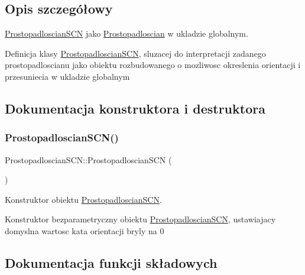 \subsection{Opis szczegółowy}
\hyperlink{classProstopadloscianSCN}{Prostopadloscian\+S\+CN} jako \hyperlink{classProstopadloscian}{Prostopadloscian} w ukladzie globalnym. 

Definicja klasy \hyperlink{classProstopadloscianSCN}{Prostopadloscian\+S\+CN}, sluzacej do interpretacji zadanego prostopadloscianu jako obiektu rozbudowanego o mozliwosc okreslenia orientacji i przesuniecia w ukladzie globalnym 

\subsection{Dokumentacja konstruktora i destruktora}
\mbox{\label{classProstopadloscianSCN_a8288627cc69c54812c06be68950615f5}} 
\subsubsection{\texorpdfstring{Prostopadloscian\+S\+C\+N()}{ProstopadloscianSCN()}}
{\footnotesize\ttfamily Prostopadloscian\+S\+C\+N\+::\+Prostopadloscian\+S\+CN (\begin{DoxyParamCaption}{ }\end{DoxyParamCaption})\hspace{0.3cm}{\ttfamily [inline]}}



Konstruktor obiektu \hyperlink{classProstopadloscianSCN}{Prostopadloscian\+S\+CN}. 

Konstruktor bezparametryczny obiektu \hyperlink{classProstopadloscianSCN}{Prostopadloscian\+S\+CN}, ustawiajacy domyslna wartosc kata orientacji bryly na 0 

\subsection{Dokumentacja funkcji składowych}
\mbox{\label{classProstopadloscianSCN_ada3c51233b828c9ee8466a1c4270906b}} 
